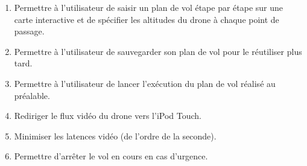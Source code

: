 \documentclass{article}
\begin{document}
        \vspace*{1cm}
		\begin{enumerate}
        	\item Permettre à l'utilisateur de saisir un plan de vol étape par étape sur une carte interactive et de spécifier les altitudes du drone à chaque point de passage.
        	\item Permettre à l'utilisateur de sauvegarder son plan de vol pour le réutiliser plus tard.
			\item Permettre à l'utilisateur de lancer l'exécution du plan de vol réalisé au préalable.
		 	\item Rediriger le flux vidéo du drone vers l'iPod Touch. 
		 	\item Minimiser les latences vidéo (de l'ordre de la seconde).
		 	\item Permettre d'arrêter le vol en cours en cas d'urgence.
		\end{enumerate}
		
	\newpage
\end{document}
